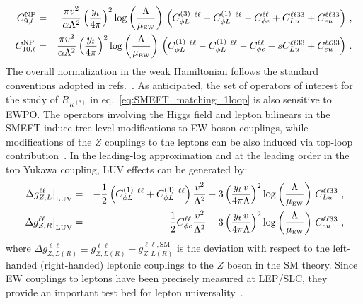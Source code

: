 \begin{eqnarray} 
	\label{eq:_C9_C10}
	C_{9,\ell}^{\rm NP}&=& \frac{\pi v^{2}}{\alpha \Lambda^2} \left(\frac{y_{t} }{4 \pi}\right)^2 \log \left( \frac{\Lambda}{\mu_{\textrm{\tiny{EW}}}} \right)   \, \left(C_{\phi L}^{(3)}\ ^{\ell \ell}-C_{\phi L}^{(1)}\ ^{\ell \ell}-C^{\ell \ell}_{\phi e}+ C_{Lu}^{\ell \ell 3 3} + C_{eu}^{\ell \ell 3 3} \right)\,,\nonumber \\
	C_{10,\ell}^{\rm NP}&=& \frac{\pi v^{2}}{\alpha \Lambda^2} \left(\frac{y_{t} }{4 \pi}\right)^2 \log \left( \frac{\Lambda}{\mu_{\textrm{\tiny{EW}}}} \right)   \, \left(C_{\phi L}^{(1)}\ ^{\ell \ell}-C_{\phi L}^{(1)}\ ^{\ell \ell}-C^{\ell \ell}_{\phi e}-s C_{Lu}^{\ell \ell 3 3} + C_{eu}^{\ell \ell 3 3} \right)\, .
\end{eqnarray} 
The overall normalization in the weak Hamiltonian follows the standard conventions adopted in refs.~\cite{Ciuchini:2015qxb,Ciuchini:2017mik,Ciuchini:2019usw}.
As anticipated, the set of operators of interest for the study of $R_{K^{(*)}}$ in eq.~\eqref{eq:SMEFT_matching_1loop} is also sensitive to EWPO.  The operators involving the Higgs field and lepton bilinears in the SMEFT induce tree-level modifications to EW-boson couplings, while modifications of the $Z$ couplings to the leptons can be also induced via top-loop
 contribution~\cite{deBlas:2015aea}. In the leading-log approximation and at the leading order in the top Yukawa coupling, LUV effects can be generated by:
%
\begin{eqnarray}
	\label{eq:OLuedRGE}
	\left.\Delta g_{Z,L}^{\ell\ell}\right|_{\mathrm{LUV}} & = &
	- \frac 12 \left( C_{\phi L}^{(1)}\ ^{\ell \ell} +C_{\phi L}^{(3)}\ ^{\ell \ell} \right)\frac{v^2}{\Lambda^2}-
	3 \left( \frac{ y_t \, v}{4 \pi \Lambda} \right)^2 \log\left(\frac{\Lambda}{\mu_{\textrm{\tiny{EW}}}} \right) \, C_{Lu}^{\ell\ell33}  \ , \\ \nonumber
	\left.\Delta g_{Z,R}^{\ell\ell}\right|_{\mathrm{LUV}} & = & 
	- \frac 12 C^{\ell\ell}_{\phi e}\frac{v^2}{\Lambda^2}-
	3 \left( \frac{ y_t \, v}{4 \pi \Lambda} \right)^2 \log\left(\frac{\Lambda }{\mu_{\textrm{\tiny{EW}}}}\right) \, C_{eu}^{\ell\ell33} \ ,
\end{eqnarray}
where $\Delta g_{Z,L (R)}^{\ell\ell} \equiv g_{Z,L(R)}^{\ell\ell} - g_{Z,L (R)}^{\ell\ell,\textrm{SM}}$ is the deviation with respect to the left-handed (right-handed) leptonic couplings to the $Z$ boson in the SM theory. Since  EW couplings to leptons have been precisely measured at LEP/SLC, they provide an important test bed for lepton universality~\cite{Efrati:2015eaa,deBlas:2016ojx}.\\

